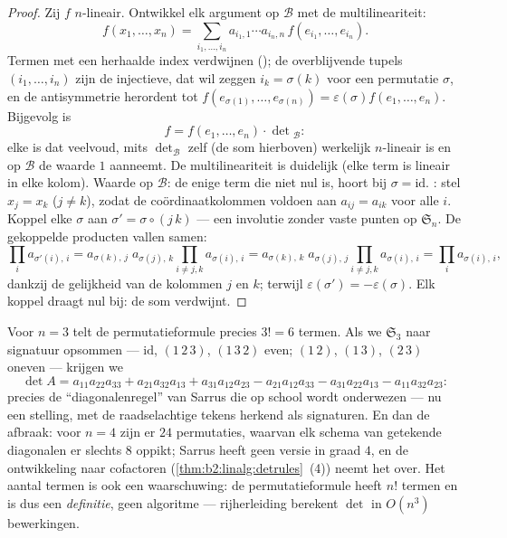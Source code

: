 \begin{proof}
Zij $f$  $n$-lineair. Ontwikkel elk argument op
$\mathcal{B}$ met de multilineariteit:
\[
f(x_1, \dots, x_n)
= \sum_{i_1, \dots, i_n} a_{i_1,1}\cdots a_{i_n,n}\,
f(e_{i_1}, \dots, e_{i_n}).
\]
Termen met een herhaalde index verdwijnen (); de
overblijvende tupels $(i_1, \dots, i_n)$ zijn de injectieve, dat
wil zeggen $i_k = \sigma(k)$ voor een permutatie $\sigma$, en de
antisymmetrie herordent tot $f(e_{\sigma(1)}, \dots,
e_{\sigma(n)}) = \varepsilon(\sigma) f(e_1, \dots, e_n)$.
Bijgevolg is
\[
f = f(e_1, \dots, e_n) \cdot \det{}_{\mathcal{B}} :
\]
elke  is dat veelvoud, mits
$\det_{\mathcal{B}}$ zelf (de som hierboven) werkelijk
 $n$-lineair is en op $\mathcal B$ de waarde $1$
aanneemt. De multilineariteit is duidelijk (elke term is lineair
in elke kolom). Waarde op $\mathcal B$: de enige term die niet nul
is, hoort bij $\sigma = \mathrm{id}$. : stel $x_j =
x_k$ ($j \neq k$), zodat de coördinaatkolommen voldoen aan $a_{i
j} = a_{i k}$ voor alle $i$. Koppel elke $\sigma$ aan $\sigma' =
\sigma\circ(j\,k)$ --- een involutie zonder vaste punten op
$\mathfrak{S}_n$. De gekoppelde producten vallen samen:
\[
\prod_i a_{\sigma'(i),\,i}
= a_{\sigma(k),\,j}\; a_{\sigma(j),\,k}
\prod_{i \neq j,k} a_{\sigma(i),\,i}
= a_{\sigma(k),\,k}\; a_{\sigma(j),\,j}
\prod_{i \neq j,k} a_{\sigma(i),\,i}
= \prod_i a_{\sigma(i),\,i},
\]
dankzij de gelijkheid van de kolommen $j$ en $k$; terwijl
$\varepsilon(\sigma') = -\varepsilon(\sigma)$. Elk koppel draagt
nul bij: de som verdwijnt.
\end{proof}

\begin{example}\label{ex:b2:linalg:sarrus}
Voor $n = 3$ telt de permutatieformule precies $3! = 6$ termen.
Als we $\mathfrak{S}_3$ naar signatuur opsommen ---
$\mathrm{id}$, $(1\,2\,3)$, $(1\,3\,2)$ even; $(1\,2)$, $(1\,3)$,
$(2\,3)$ oneven --- krijgen we
\[
\det A = a_{11}a_{22}a_{33} + a_{21}a_{32}a_{13} +
a_{31}a_{12}a_{23}
- a_{21}a_{12}a_{33} - a_{31}a_{22}a_{13} -
a_{11}a_{32}a_{23} :
\]
precies de ``diagonalenregel'' van Sarrus die op school wordt
onderwezen --- nu een stelling, met de raadselachtige tekens
herkend als signaturen. En dan de afbraak: voor $n = 4$ zijn er
$24$ permutaties, waarvan elk schema van getekende diagonalen er
slechts $8$ oppikt; Sarrus heeft geen versie in graad $4$, en de
ontwikkeling naar cofactoren (\cref{thm:b2:linalg:detrules}~(4))
neemt het over. Het aantal termen is ook een waarschuwing: de
permutatieformule heeft $n!$ termen en is dus een
\emph{definitie}, geen algoritme --- rijherleiding berekent
$\det$ in $O(n^3)$ bewerkingen.
\end{example}

